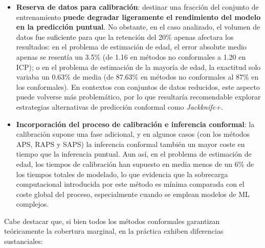 \begin{itemize}

    \item \textbf{Reserva de datos para calibración}: destinar una fracción del conjunto de entrenamiento \textbf{puede degradar ligeramente el rendimiento del modelo en la predicción puntual}. No obstante, en el caso analizado, el volumen de datos fue suficiente para que la retención del 20\% apenas afectara los resultados: en el problema de estimación de edad, el error absolute medio apenas se resentía un 3.5\% (de 1.16 en métodos no conformales a 1.20 en ICP); o en el problema de estimación de la mayoría de edad, la exactitud solo variaba un 0.63\% de media (de 87.63\% en métodos no conformales al 87\% en los conformales). En contextos con conjuntos de datos reducidos, este aspecto puede volverse más problemático, por lo que resultaría recomendable explorar estrategias alternativas de predicción conformal como \textit{Jackknife+}. 
    
    \item \textbf{Incorporación del proceso de calibración e inferencia conformal}: la calibración supone una fase adicional, y en algunos casos (con los métodos APS, RAPS y SAPS) la inferencia conformal también un mayor coste en tiempo que la inferencia puntual. Aun así, en el problema de estimación de edad, los tiempos de calibración han supuesto en media menos de un 6\% de los tiempos totales de modelado, lo que evidencia que la sobrecarga computacional introducida por este método es mínima comparada con el coste global del proceso, especialmente cuando se emplean modelos de ML complejos. 

\end{itemize}



Cabe destacar que, si bien todos los métodos conformales garantizan teóricamente la cobertura marginal, en la práctica exhiben diferencias sustanciales:

